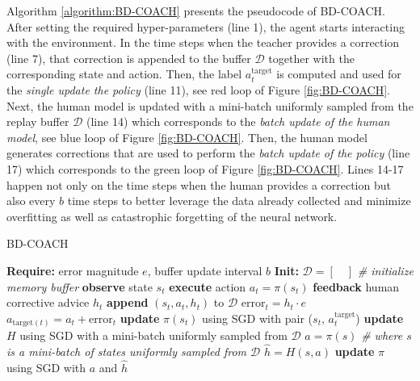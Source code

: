 Algorithm \ref{algorithm:BD-COACH} presents the pseudocode of BD-COACH. After setting the required hyper-parameters (line 1), the agent starts interacting with the environment. In the time steps when the teacher provides a correction (line 7), that correction is appended to the buffer $\mathcal{D}$ together with the corresponding state and action. Then, the label $a^{\text{target}}_{t}$ is computed and used for the \textit{single update the policy} (line 11), see red loop of Figure \ref{fig:BD-COACH}. Next, the human model is updated with a mini-batch uniformly sampled from the replay buffer $\mathcal{D}$ (line 14) which corresponds to the \textit{batch update of the human model}, see blue loop of Figure \ref{fig:BD-COACH}. Then, the human model generates corrections that are used to perform the \textit{batch update of the policy} (line 17) which corresponds to the green loop of Figure \ref{fig:BD-COACH}. Lines 14-17 happen not only on the time steps when the human provides a correction but also every $b$ time steps to better leverage the data already collected and minimize overfitting as well as catastrophic forgetting of the neural network.



\begin{algorithm}[H]
\caption{BD-COACH}\label{algorithm:BD-COACH}
\begin{algorithmic}[1]
\State \textbf{Require:} error magnitude $e$, buffer update interval $b$
\State \textbf{Init:} $\mathcal{D} = [\quad]$  \emph{\# initialize memory buffer}
\State \textbf{observe} state $s_{t}$
\State \textbf{execute} action $a_{t}=\pi(s_{t})$
\State \textbf{feedback} human corrective advice $h_{t}$
\State \textbf{append} $(s_{t}, a_{t}, h_{t})$ to $\mathcal{D}$
\State $\text{error}_{t} = h_{t}\cdot e$
\State $a_{\text{target}(t)} = a_{t} + \text{error}_{t}$
\State \textbf{update} $\pi(s_{t})$ using SGD with pair ($s_{t}$, $a^{\text{target}}_{t}$)
\EndIf
{}
\State \textbf{update} $H$ using SGD with a mini-batch uniformly sampled from $\mathcal{D}$
\State  $a=\pi(s)$ \emph{\# where $s$ is a mini-batch of states uniformly sampled from $\mathcal{D}$}
\State  $\hat{h}=H(s, a)$
\State \textbf{update} $\pi$ using SGD with $a$ and $\hat{h}$
\EndIf
\EndFor
\end{algorithmic}
\end{algorithm}












